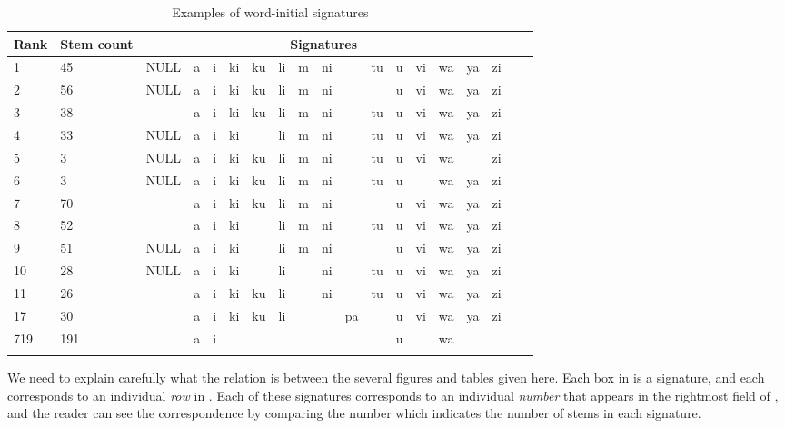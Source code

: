\documentclass[output=paper,colorlinks,citecolor=brown]{langscibook}
\begin{document}
%
% 
\begin{table}
\begin{tabular}{lllllllllllllllllll}\lsptoprule
Rank& Stem count & \multicolumn{15}{c}{Signatures} \\ \midrule
1 & 45 & NULL & a &  i &  ki &  ku &  li &  m &  ni  &&  tu &  u &  vi &  wa &  ya &  zi \\
2 & 56 & NULL & a &  i &  ki &  ku &  li &  m &  ni &   & &  u &  vi &  wa & ya  &  zi   \\
3 & 38 &      & a &  i &  ki &  ku &  li &  m &  ni  &&  tu &  u &  vi &  wa &  ya &  zi \\
4 & 33 &  NULL & a &  i &  ki &  &  li &  m &  ni &   &  tu &  u &  vi &  wa &  ya &  zi  \\
5 & 3  & NULL & a &  i &  ki &  ku &  li &  m &  ni &   &  tu &  u &  vi &  wa &    &  zi\\
6 & 3 & NULL & a &  i &  ki &  ku &  li &  m &  ni &  &  tu &  u &   &  wa &  ya &  zi  \\
7 & 70 &    & a &  i &  ki &  ku &  li &  m &  ni  &&    &  u &  vi &  wa &  ya &  zi  \\
8 & 52 &   & a &  i &  ki &   &  li &  m &  ni &  &  tu  &  u &  vi &  wa &  ya &  zi  \\
9 & 51 & NULL & a &  i &  ki &   &  li & m &  ni &   &   &  u &  vi &  wa &  ya &  zi\\
10 & 28  & NULL & a &  i &  ki &   &  li &   & ni  &   &  tu &  u &  vi &  wa &  ya &  zi\\
11 & 26 & & a &  i &  ki & ku  &  li &    &  ni &   &  tu &  u &  vi &  wa &  ya &  zi \\
17 &  30 &  & a &  i &  ki &  ku &  li &   &    & pa &    &  u &  vi &  wa &  ya &  zi \\
719  & 191 && a &i &&&&&&&&u &&wa  \\  \lspbottomrule
\end{tabular}
\caption{Examples of word-initial signatures}
\label{topsigexamples}
\end{table}



  


We need to explain carefully what the relation is between the several figures and tables given here. Each box in  is a signature, and each corresponds to an individual \textit{row} in  . Each of these signatures corresponds to an individual \textit{number} that appears in the rightmost field of  , and the reader can see the correspondence by comparing the number which indicates the number of stems in each signature.
\end{document}
